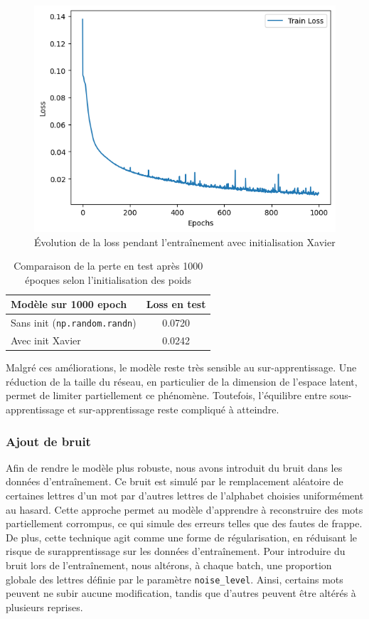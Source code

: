 \documentclass{article}
\begin{document}
\begin{figure}[H]
    \centering
    \includegraphics[width=0.6\linewidth]{Images/loss_xavier_init.png}
    \caption{Évolution de la loss pendant l’entraînement avec initialisation Xavier}
    \label{fig:loss_xavier_init}
\end{figure}

\begin{table}[H]
\centering
\begin{tabular}{lc}
\hline
\textbf{Modèle sur 1000 epoch} & \textbf{Loss en test} \\
\hline
Sans init (\texttt{np.random.randn}) & 0.0720 \\
Avec init Xavier & 0.0242 \\
\hline
\end{tabular}
\caption{Comparaison de la perte en test après 1000 époques selon l'initialisation des poids}
\end{table}

Malgré ces améliorations, le modèle reste très sensible au sur-apprentissage. Une réduction de la taille du réseau, en particulier de la dimension de l’espace latent, permet de limiter partiellement ce phénomène. Toutefois, l’équilibre entre sous-apprentissage et sur-apprentissage reste compliqué à atteindre.

\subsubsection{Ajout de bruit}

Afin de rendre le modèle plus robuste, nous avons introduit du bruit dans les données d’entraînement. Ce bruit est simulé par le remplacement aléatoire de certaines lettres d’un mot par d’autres lettres de l’alphabet choisies uniformément au hasard. Cette approche permet au modèle d’apprendre à reconstruire des mots partiellement corrompus, ce qui simule des erreurs telles que des fautes de frappe. De plus, cette technique agit comme une forme de régularisation, en réduisant le risque de surapprentissage sur les données d'entraînement. Pour introduire du bruit lors de l'entraînement, nous altérons, à chaque batch, une proportion globale des lettres définie par le paramètre \texttt{noise\_level}. Ainsi, certains mots peuvent ne subir aucune modification, tandis que d’autres peuvent être altérés à plusieurs reprises.
\end{document}
